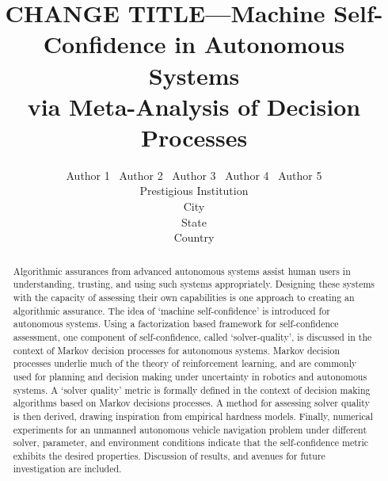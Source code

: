 \documentclass[10pt]{article}
\title{CHANGE TITLE---Machine Self-Confidence in Autonomous Systems \\ via  Meta-Analysis of Decision Processes}%
\author{Author 1 \ Author 2 \ Author 3 \ Author 4 \ Author 5\\ 
        Prestigious Institution\\
        City\\
        State\\
        Country
    }
\begin{document}
\maketitle
\begin{abstract}
    Algorithmic assurances from advanced autonomous systems assist human users in understanding, trusting, and using such systems appropriately. Designing these systems with the capacity of assessing their own capabilities is one approach to creating an algorithmic assurance. The idea of `machine self-confidence' is introduced for autonomous systems. Using a factorization based framework for self-confidence assessment, one component of self-confidence, called `solver-quality', is discussed in the context of Markov decision processes for autonomous systems. Markov decision processes underlie much of the theory of reinforcement learning, and are commonly used for planning and decision making under uncertainty in robotics and autonomous systems. A `solver quality' metric is formally defined in the context of decision making algorithms based on Markov decisions processes. A method for assessing solver quality  is then derived, drawing inspiration from empirical hardness models. Finally, numerical experiments for an unmanned autonomous vehicle navigation problem under different solver, parameter, and environment conditions indicate that the self-confidence metric exhibits the desired properties. Discussion of results, and avenues for future investigation are included.
\end{abstract}








\printbibliography
\end{document}

